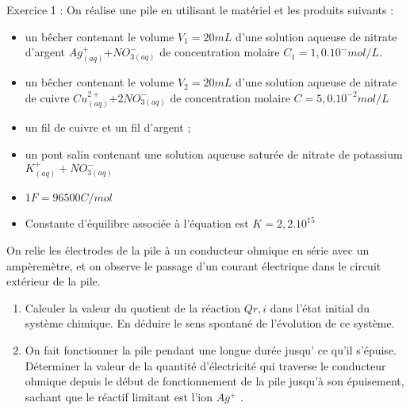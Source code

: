 \documentclass[12pt, french]{article}
\begin{document}
\begin{center}

\end{center}

\vspace{-0.2cm}
   \begin{Box2}{Exercice 1 :}
On réalise une pile en utilisant le matériel et les produits suivants :

\begin{itemize}
	\item un bêcher contenant le volume $V_1 = 20 mL$ d’une solution aqueuse de nitrate d’argent $Ag^+_{(aq)}$+$NO^-_{3(aq)}$ de concentration molaire $ C_1 =1,0.10^- mol/L$.

	\item un bêcher contenant le volume $V_2=20 mL$ d’une solution aqueuse de nitrate de cuivre $Cu^{2+}_{(aq)} $+$ 2NO^-_{3(aq)}$ de concentration molaire  $C =5,0.10^{-2} mol/L$
	\item  un fil de cuivre et  un fil d’argent ;
	\item un pont salin contenant une solution aqueuse saturée de nitrate de potassium $K^+_{(aq)} + NO^-_{3(aq)}$
	\item $1F=96500 C/mol$ 
	\item Constante d’équilibre associée à l’équation  est $K = 2,2.10^{15}$
\end{itemize}

On relie les électrodes de la pile à un conducteur ohmique en série avec un ampèremètre, et on
observe le passage d’un courant électrique dans le circuit extérieur de la pile.
\begin{enumerate}
	\item  Calculer la valeur du quotient de la réaction $Qr,i$
dans l’état initial du système chimique. En déduire
le sens spontané de l’évolution de ce système.

\item  On fait fonctionner la pile pendant une longue durée jusqu’ ce qu’il s’épuise. Déterminer la valeur
de la quantité d’électricité qui traverse le conducteur ohmique depuis le début de fonctionnement de la
pile jusqu'à son épuisement, sachant que le réactif limitant est l’ion
$Ag^+$ .


\end{enumerate}
   \end{Box2}
\end{document}
